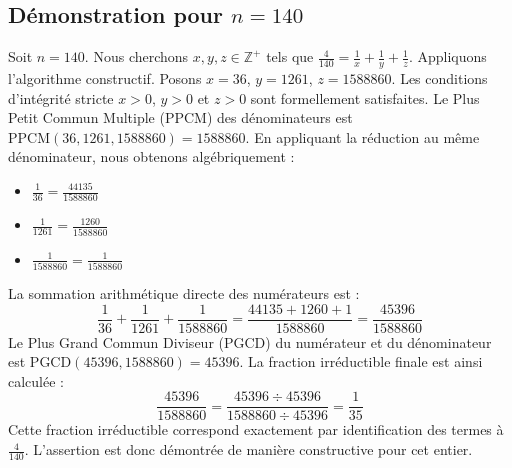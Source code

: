 \documentclass[11pt,a4paper]{article}
\begin{document}
\subsection{Démonstration pour $n = 140$}
Soit $n = 140$. Nous cherchons $x, y, z \in \mathbb{Z}^{+}$ tels que $\frac{4}{140} = \frac{1}{x} + \frac{1}{y} + \frac{1}{z}$.
Appliquons l'algorithme constructif. Posons $x = 36$, $y = 1261$, $z = 1588860$.
Les conditions d'intégrité stricte $x > 0$, $y > 0$ et $z > 0$ sont formellement satisfaites.
Le Plus Petit Commun Multiple (PPCM) des dénominateurs est $\text{PPCM}(36, 1261, 1588860) = 1588860$.
En appliquant la réduction au même dénominateur, nous obtenons algébriquement :
\begin{itemize}
    \item $\frac{1}{36} = \frac{44135}{1588860}$
    \item $\frac{1}{1261} = \frac{1260}{1588860}$
    \item $\frac{1}{1588860} = \frac{1}{1588860}$
\end{itemize}
La sommation arithmétique directe des numérateurs est :
$$ \frac{1}{36} + \frac{1}{1261} + \frac{1}{1588860} = \frac{44135 + 1260 + 1}{1588860} = \frac{45396}{1588860} $$
Le Plus Grand Commun Diviseur (PGCD) du numérateur et du dénominateur est $\text{PGCD}(45396, 1588860) = 45396$.
La fraction irréductible finale est ainsi calculée :
$$ \frac{45396}{1588860} = \frac{45396 \div 45396}{1588860 \div 45396} = \frac{1}{35} $$
Cette fraction irréductible correspond exactement par identification des termes à $\frac{4}{140}$. L'assertion est donc démontrée de manière constructive pour cet entier.
\end{document}
